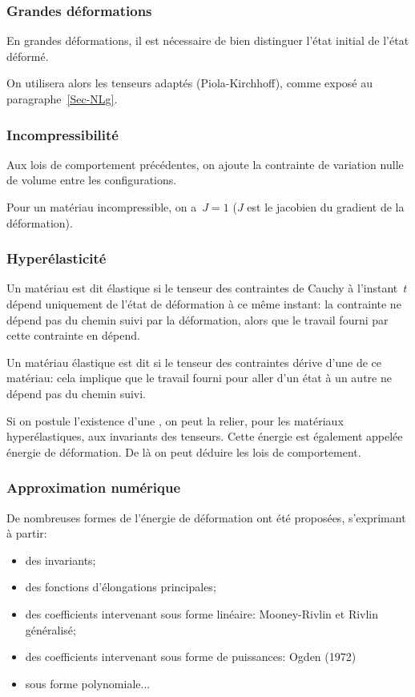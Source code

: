 \medskip
\subsubsection{Grandes déformations}
En grandes déformations, il est nécessaire de bien distinguer l'état initial de
l'état déformé.

On utilisera alors les tenseurs adaptés (Piola-Kirchhoff), comme exposé au paragraphe~\ref{Sec-NLg}.


\medskip
\subsubsection{Incompressibilité}
Aux lois de comportement précédentes, on ajoute la contrainte de variation
nulle de volume entre les configurations.

Pour un matériau incompressible, on a~$J=1$ ($J$ est le jacobien du gradient de la déformation).

\medskip
\subsubsection{Hyperélasticité}
Un matériau est dit élastique si le tenseur des contraintes de Cauchy à l'instant~$t$
dépend uniquement de l'état de déformation à ce même instant: la contrainte ne
dépend pas du chemin suivi par la déformation, alors que le travail fourni par cette
contrainte en dépend.

Un matériau élastique est dit  si le tenseur des contraintes dérive
d'une  de ce matériau: cela implique que le travail fourni pour aller
d'un état à un autre ne dépend pas du chemin suivi.

Si on postule l'existence d'une , on peut la relier, pour les matériaux
hyperélastiques, aux invariants des tenseurs. Cette énergie est également appelée énergie de
déformation. De là on peut déduire les lois de comportement.


\medskip
\subsubsection{Approximation numérique}
De nombreuses formes de l'énergie de déformation ont été proposées, s'exprimant à partir:
\begin{itemize}
	\item des invariants;
	\item des fonctions d'élongations principales;
	\item des coefficients intervenant sous forme linéaire: Mooney-Rivlin
	et Rivlin généralisé;
	\item des coefficients intervenant sous forme de puissances: Ogden (1972)
	\item sous forme polynomiale...
\end{itemize}

